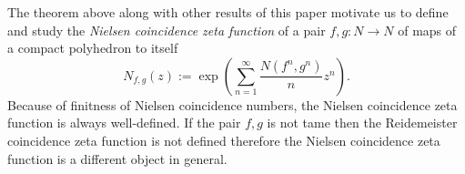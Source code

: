 \documentclass[12pt, a4paper]{amsart}
\begin{document}
The theorem above along with other results of this paper motivate us to define and study
the \emph{Nielsen coincidence zeta function} of a pair $f,g: N \to N$ of maps
of a compact polyhedron to itself
\begin{equation}\label{eq:nielsen-zeta-def}
  N_{f,g}(z) := \exp \left( \sum_{n=1}^{\infty} \frac{N(f^n, g^n)}{n} z^n \right).
\end{equation}
Because of finitness of Nielsen coincidence numbers,
the Nielsen coincidence zeta function is always well-defined.
If the pair $f,g$ is not tame then the Reidemeister coincidence zeta function is not defined
therefore the Nielsen coincidence zeta function is a different object in general.
\end{document}
